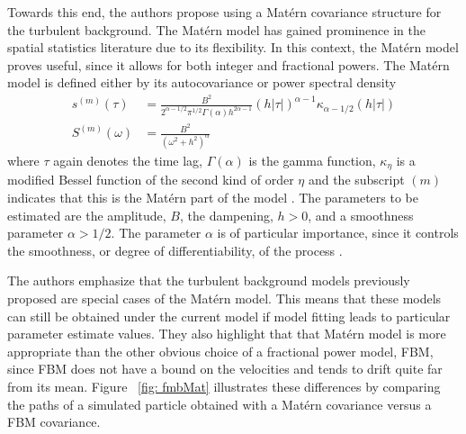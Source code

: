 \documentclass{stat572Style}
\begin{document}
Towards this end, the authors propose using a Mat\'{e}rn covariance structure \citep{Gneiting2012} for the turbulent background. 
The Mat\'{e}rn model has gained prominence in the spatial statistics literature due to its flexibility.
 In this context, the Mat\'{e}rn model proves useful, since it allows for both integer and fractional powers. 
 The Mat\'{e}rn model is defined either by its autocovariance or power spectral density
\begin{align}
\label{eq:maternAC}
s^{(m)}(\tau) &= \frac{B^{2}}{2^{\alpha - 1/2}\pi^{1/2} \Gamma(\alpha) h^{2 \alpha - 1}}(h|\tau|)^{\alpha - 1}\kappa_{\alpha - 1/2}(h|\tau|)\\
\label{eq:maternPSD}
S^{(m)}(\omega) &= \frac{B^{2}}{(\omega^{2} + h^{2})^{\alpha}}
\end{align}
where $\tau$ again denotes the time lag, $\Gamma(\alpha)$ is the gamma function,  $\kappa_{\eta}$ is a modified Bessel function of the second kind of order $\eta$  and the subscript $(m)$ indicates that this is the Mat\'{e}rn part of the model \citep{Stein2012}. 
The parameters to be estimated are the amplitude, $B$, the dampening, $h > 0$, and a smoothness parameter $\alpha > 1/2$.
 The parameter $\alpha$ is of particular importance, since it controls the smoothness, or degree of differentiability, of the process \citep{Fuentes2010}. 

The authors emphasize that the turbulent background models previously proposed are special cases of the Mat\'{e}rn model. 
This means that these models can still be obtained under the current model if model fitting leads to particular parameter estimate values. 
They also highlight that that Mat\'{e}rn model is more appropriate than the other obvious choice of a fractional power model, FBM, since FBM does not have a bound on the velocities and tends to drift quite far from its mean.
 Figure ~\ref{fig: fmbMat} illustrates these differences by comparing the paths of a simulated particle obtained with a Mat\'{e}rn  covariance versus a FBM covariance. 
\end{document}
